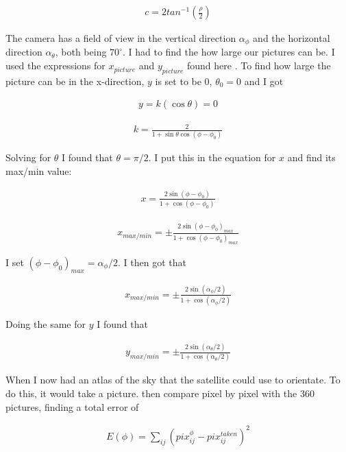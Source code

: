 \documentclass[a4paper, 10pt]{article}
\begin{document}
\begin{align}
c = 2tan^{-1} \left( \frac{\rho}{2} \right)
\end{align}


The camera has a field of view in the vertical direction $\alpha_{\phi}$ and the horizontal direction $\alpha_{\theta}$, both being $70^\circ$. I had to find the how large our pictures can be. I used the expressions for $x_{picture}$ and $y_{picture}$ found here \cite{part4}. To find how large the picture can be in the x-direction, $y$ is set to be $0$, $\theta_0 = 0$ and I got

\begin{align}
y = k(\cos \theta ) = 0
\end{align}

\begin{align}
k = \frac{2}{1+\sin \theta \cos (\phi - \phi_0)}
\end{align}

Solving for $\theta$ I found that $\theta = \pi/2$. I put this in the equation for $x$ and find its max/min value:

\begin{align}
x = \frac{2 \sin(\phi - \phi_0)}{1+\cos (\phi - \phi_0)}
\end{align}

\begin{align}
x_{max/min} = \pm \frac{2 \sin(\phi - \phi_0)_{max}}{1+\cos (\phi - \phi_0)_{max}}
\end{align}

I set $(\phi - \phi_0)_{max} = \alpha_{\phi}/2$. I then got that

\begin{align}
x_{max/min} = \pm \frac{2 \sin(\alpha_{\phi}/2)}{1+\cos (\alpha_{\phi}/2)}
\end{align}

Doing the same for $y$ I found that 

\begin{align}
y_{max/min} = \pm \frac{2 \sin(\alpha_{\theta}/2)}{1+\cos (\alpha_{\theta}/2)}
\end{align}


When I now had an atlas of the sky that the satellite could use to orientate. To do this, it would take a picture. then compare pixel by pixel with the 360 pictures, finding a total error of
 
\begin{align}
E(\phi) = \sum_{ij}(pix_{ij}^{\phi} - pix_{ij}^{taken})^2
\end{align}
\end{document}
